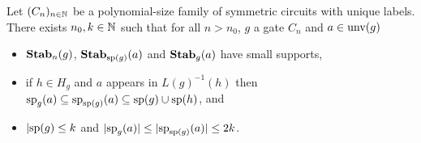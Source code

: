 \documentclass[../paper.tex]{subfiles}
\begin{document}
\begin{lem}
  \label{lem:row-column-supports}
  Let $(C_n)_{n \in \mathbb{N}}$ be a polynomial-size family of symmetric circuits
  with unique labels. There exists $n_0, k \in \mathbb{N}$ such that for all $n >
  n_0$, $g$ a gate $C_n$ and $a \in \text{unv}(g)$
  \begin{itemize}
    \setlength\itemsep{0mm}
  \item $\text{\textbf{Stab}}_n(g)$, $\text{\textbf{Stab}}_{\text{sp}(g)}(a)$ and $\text{\textbf{Stab}}_{g}(a)$ have small
    supports,
  \item if $h \in H_g$ and $a$ appears in $L(g)^{-1}(h)$ then $\text{sp}_g(a)
    \subseteq \text{sp}_{\text{sp}(g)}(a) \subseteq \text{sp}(g) \cup \text{sp}(h)$, and
  \item $\vert \text{sp}(g) \leq k$ and $\vert \text{sp}_g(a) \vert \leq \vert
    \text{sp}_{\text{sp}(g)}(a) \vert \leq 2k$.
  \end{itemize}

  

\end{lem}
\end{document}
